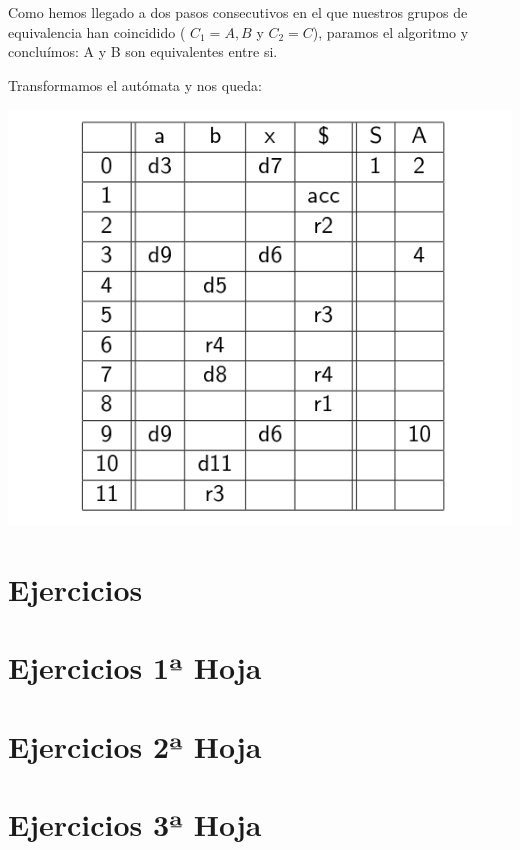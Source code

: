\documentclass{apuntes}
\begin{document}
\begin{example}
\begin{enumerate}
\begin{itemize}
Como hemos llegado a dos pasos consecutivos en el que nuestros grupos de equivalencia han coincidido ( $C_1={A,B}$ y $C_2={C}$), paramos el algoritmo y concluímos: A y B son equivalentes entre si.
\end{itemize}
\end{enumerate}

Transformamos el autómata y nos queda:

\begin{center}
\includegraphics[scale=0.4]{img/tablaanalisislr1.jpg}
\end{center}

\end{example}


\appendix
\chapter{Ejercicios}


\chapter{Ejercicios 1ª Hoja}


\chapter{Ejercicios 2ª Hoja}


\chapter{Ejercicios 3ª Hoja}



\printindex
\end{document}
